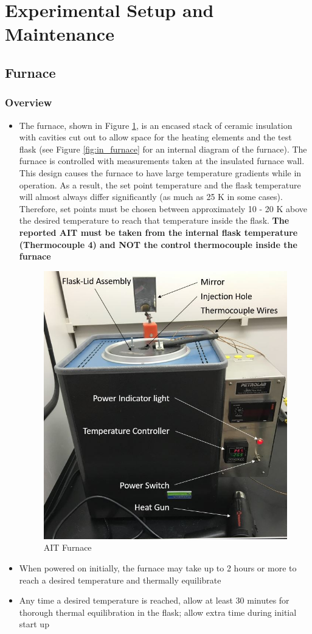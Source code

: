 \documentclass[letterpaper,11pt]{article}
\newcommand\blankpage{%
    \null
    \thispagestyle{empty}%
    \newpage}
\begin{document}
\newpage
\blankpage
\section{Experimental Setup and Maintenance}
    \subsection{Furnace}
        \subsubsection{Overview}
    \begin{itemize}
    \item The furnace, shown in Figure \ref{fig:furnace_pic}, is an encased 
        stack of ceramic insulation with cavities 
        cut out to allow space for the heating elements and the test flask
        (see Figure \ref{fig:in_furnace} for an internal diagram of the 
        furnace). The furnace is controlled with measurements taken at the 
        insulated furnace wall. This design causes the furnace to have
        large temperature gradients while in operation. As a result, the 
        set point temperature and the flask temperature will almost always 
        differ significantly (as much as 25 K in some cases). Therefore, 
        set points must be chosen between approximately 10 - 20 K above the 
        desired temperature to reach that temperature inside the flask.
        \textbf{The reported AIT must be taken from the internal flask 
        temperature (Thermocouple 4) and NOT the control thermocouple inside
        the furnace}
    
    \begin{figure}[H]
    \centering
    \includegraphics[width=.45\textwidth]{Furnace_pic_diagram.jpg}
    \caption{AIT Furnace}
    \label{fig:furnace_pic}
    \end{figure}
    
    \item When powered on initially, the furnace may take up to 2 hours or more  
        to reach a desired temperature and thermally equilibrate
    \item Any time a desired temperature is reached, allow at least 30 
        minutes for thorough thermal equilibration in the flask; allow extra 
        time during initial start up
     
     \end{itemize}
\end{document}
